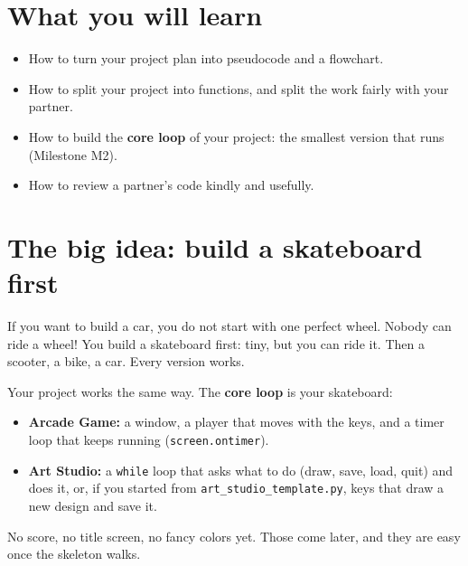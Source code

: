 
\section{What you will learn}
\begin{itemize}
  \item How to turn your project plan into pseudocode and a flowchart.
  \item How to split your project into functions, and split the work fairly with your partner.
  \item How to build the \textbf{core loop} of your project: the smallest version that runs (Milestone M2).
  \item How to review a partner's code kindly and usefully.
\end{itemize}

\section{The big idea: build a skateboard first}
If you want to build a car, you do not start with one perfect wheel. Nobody can ride a wheel! You
build a skateboard first: tiny, but you can ride it. Then a scooter, a bike, a car. Every version works.

Your project works the same way. The \textbf{core loop} is your skateboard:
\begin{itemize}
  \item \textbf{Arcade Game:} a window, a player that moves with the keys, and a timer loop that keeps running (\texttt{screen.ontimer}).
  \item \textbf{Art Studio:} a \texttt{while} loop that asks what to do (draw, save, load, quit) and does it,
        or, if you started from \texttt{art\_studio\_template.py}, keys that draw a new design and save it.
\end{itemize}
No score, no title screen, no fancy colors yet. Those come later, and they are easy once the
skeleton walks.

